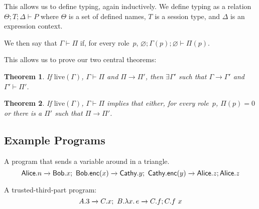 \documentclass{article}
\newtheorem{thm}{Theorem}
\theoremstyle{definition}
\newcommand{\subst}[3]{#1~[#2 \mapsto #3]}
\newcommand{\own}[2]{#1.#2}
\newcommand{\send}[3][]{#2\nolinebreak \mathrel{\xrightarrow{#1}}\nolinebreak #3}
\newcommand{\proves}{\vdash}
\begin{document}
This allows us to define typing, again inductively.
We define typing as a relation $\Theta; T; \Delta \proves P$ where $\Theta$ is a set of defined names, $T$ is a session type, and $\Delta$ is an expression context.

We then say that $\Gamma \proves \Pi$ if, for every role~$p$, $\varnothing; \Gamma(p); \varnothing \proves \Pi(p)$.

This allows us to prove our two central theorems:
\begin{thm}
  If $\text{live}(\Gamma)$, $\Gamma \proves \Pi$ and $\Pi \to \Pi'$, then $\exists \Gamma'$ such that $\Gamma \to \Gamma'$ and $\Gamma' \proves \Pi'$.
\end{thm}
\begin{thm}
  If $\text{live}(\Gamma)$, $\Gamma \proves \Pi$ implies that either, for every role~$p$, $\Pi(p) = 0$ or there is a $\Pi'$ such that $\Pi \to \Pi'$.
\end{thm}

\subsection{Example Programs}
A program that sends a variable around in a triangle.
$$\send{\own{\textsf{Alice}}{n}}{\own{\textsf{Bob}}{x}};~\send{\own{\textsf{Bob}}{\textsf{enc}(x)}}{\own{\textsf{Cathy}}{y}};~\send{\own{\textsf{Cathy}}{\textsf{enc}(y)}}{\own{\textsf{Alice}}{z}}; \own{\textsf{Alice}}{z}$$

A trusted-third-part program:
$$\send{\own{A}{3}}{\own{C}{x}};~\send{\own{B}{\lambda x.\,e}}{\own{C}{f}}; \own{C}{f~x}$$


\end{document}
